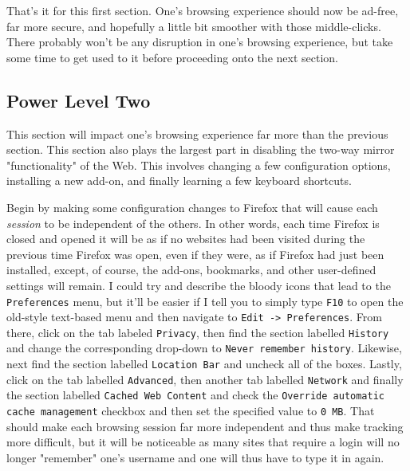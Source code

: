 \documentclass{article}
\begin{document}
That's it for this first section.  One's browsing experience should now be ad-free, far more secure, and hopefully a little bit smoother with those middle-clicks.  There probably won't be any disruption in one's browsing experience, but take some time to get used to it before proceeding onto the next section.

\subsection{Power Level Two}
This section will impact one's browsing experience far more than the previous section.  This section also plays the largest part in disabling the two-way mirror "functionality" of the Web.  This involves changing a few configuration options, installing a new add-on, and finally learning a few keyboard shortcuts.

Begin by making some configuration changes to Firefox that will cause each \textit{session} to be independent of the others.  In other words, each time Firefox is closed and opened it will be as if no websites had been visited during the previous time Firefox was open, even if they were, as if Firefox had just been installed, except, of course, the add-ons, bookmarks, and other user-defined settings will remain.  I could try and describe the bloody icons that lead to the \texttt{Preferences} menu, but it'll be easier if I tell you to simply type \texttt{F10} to open the old-style text-based menu and then navigate to \texttt{Edit -> Preferences}.  From there, click on the tab labeled \texttt{Privacy}, then find the section labelled \texttt{History} and change the corresponding drop-down to \texttt{Never remember history}.  Likewise, next find the section labelled \texttt{Location Bar} and uncheck all of the boxes.  Lastly, click on the tab labelled \texttt{Advanced}, then another tab labelled \texttt{Network} and finally the section labelled \texttt{Cached Web Content} and check the \texttt{Override automatic cache management} checkbox and then set the specified value to \texttt{0 MB}.  That should make each browsing session far more independent and thus make tracking more difficult, but it will be noticeable as many sites that require a login will no longer "remember" one's username and one will thus have to type it in again.
\end{document}
